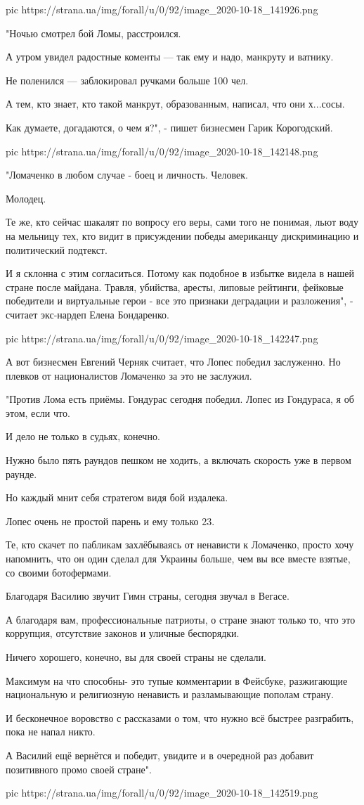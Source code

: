 \ifcmt
pic https://strana.ua/img/forall/u/0/92/image_2020-10-18_141926.png
\fi

"Ночью смотрел бой Ломы, расстроился.

А утром увидел радостные коменты --- так ему и надо, манкруту и ватнику.

Не поленился --- заблокировал ручками больше 100 чел.

А тем, кто знает, кто такой манкрут, образованным, написал, что они х...сосы.

Как думаете, догадаются, о чем я?", - пишет бизнесмен Гарик Корогодский. 

\ifcmt
pic https://strana.ua/img/forall/u/0/92/image_2020-10-18_142148.png
\fi

"Ломаченко в любом случае - боец и личность. Человек.

Молодец.

Те же, кто сейчас шакалят по вопросу его веры, сами того не понимая, льют воду
на мельницу тех, кто видит в присуждении победы американцу дискриминацию и
политический подтекст.

И я склонна с этим согласиться. Потому как подобное в избытке видела в нашей
стране после майдана. Травля, убийства, аресты, липовые рейтинги, фейковые
победители и виртуальные герои - все это признаки деградации и разложения", -
считает экс-нардеп Елена Бондаренко.

\ifcmt
pic https://strana.ua/img/forall/u/0/92/image_2020-10-18_142247.png
\fi

А вот бизнесмен Евгений Черняк считает, что Лопес победил заслуженно. Но
плевков от националистов Ломаченко за это не заслужил.

"Против Лома есть приёмы. Гондурас сегодня победил. Лопес из Гондураса, я об
этом, если что.

И дело не только в судьях, конечно.

Нужно было пять раундов пешком не ходить, а включать скорость уже в первом
раунде.

Но каждый мнит себя стратегом видя бой издалека.

Лопес очень не простой парень и ему только 23.

Те, кто скачет по пабликам захлёбываясь от ненависти к Ломаченко, просто хочу
напомнить, что он один сделал для Украины больше, чем вы все вместе взятые, со
своими ботофермами.

Благодаря Василию звучит Гимн страны, сегодня звучал в Вегасе.

А благодаря вам, профессиональные патриоты, о стране знают только то, что это
коррупция, отсутствие законов и уличные беспорядки.

Ничего хорошего, конечно, вы для своей страны не сделали.

Максимум на что способны- это тупые комментарии в Фейсбуке, разжигающие
национальную и религиозную ненависть и разламывающие пополам страну.

И бесконечное воровство с рассказами о том, что нужно всё быстрее разграбить,
пока не напал никто.

А Василий ещё вернётся и победит, увидите и в очередной раз добавит позитивного
промо своей стране".

\ifcmt
pic https://strana.ua/img/forall/u/0/92/image_2020-10-18_142519.png
\fi
